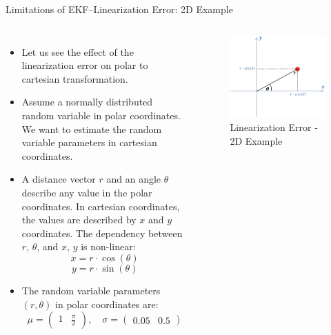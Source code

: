\begin{frame}{Limitations of EKF--Linearization Error: 2D Example}
\begin{columns}
\begin{itemize}
    \item Let us see the effect of the linearization error on polar to cartesian transformation.
    \item Assume a normally distributed random variable in polar coordinates. We want to
estimate the random variable parameters in cartesian coordinates. 
    \item A distance vector
$r$ and an angle $\theta$ describe any value in the polar coordinates. In cartesian coordinates,
the values are described by $x$ and $y$ coordinates. The dependency between $r$, $\theta$, and
$x$, $y$ is non-linear:
$$x = r\cdot\cos(\theta)$$
$$y = r\cdot\sin(\theta)$$

\item The random variable parameters \((r, \theta)\) in polar coordinates are:
\[
\mu = \begin{pmatrix}
1 & \frac{\pi}{2}
\end{pmatrix}, \quad
\sigma = \begin{pmatrix}
0.05 & 0.5
\end{pmatrix}
\]
\end{itemize}
\begin{figure}
    \centering
    \includegraphics[width=0.6\linewidth]{Figures//Part3/2DExample_LinearizationError.png}
    \vspace{-10pt}
    \caption{Linearization Error - 2D Example}
\end{figure}
\end{columns}
\end{frame}


